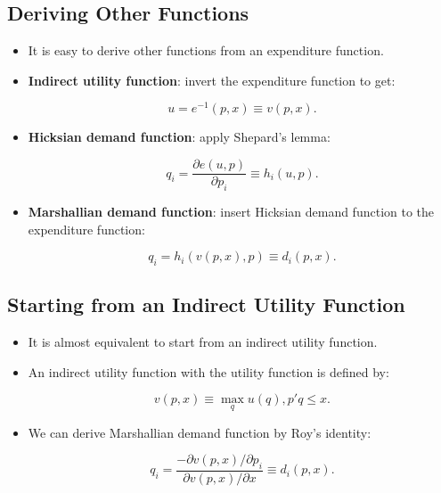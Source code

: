 \documentclass[]{book}
\providecommand{\tightlist}{%
  \setlength{\itemsep}{0pt}\setlength{\parskip}{0pt}}
\begin{document}
\subsection{Deriving Other Functions}\label{deriving-other-functions}

\begin{itemize}
\tightlist
\item
  It is easy to derive other functions from an expenditure function.
\item
  \textbf{Indirect utility function}: invert the expenditure function to
  get:

  \begin{equation}
  u = e^{-1}(p, x) \equiv v(p, x).
  \end{equation}
\item
  \textbf{Hicksian demand function}: apply Shepard's lemma:

  \begin{equation}
  q_i = \frac{\partial e(u, p)}{\partial p_i} \equiv h_i(u, p).
  \end{equation}
\item
  \textbf{Marshallian demand function}: insert Hicksian demand function
  to the expenditure function:

  \begin{equation}
  q_i = h_i(v(p, x), p) \equiv d_i(p, x).
  \end{equation}
\end{itemize}

\subsection{Starting from an Indirect Utility
Function}\label{starting-from-an-indirect-utility-function}

\begin{itemize}
\tightlist
\item
  It is almost equivalent to start from an indirect utility function.
\item
  An indirect utility function with the utility function is defined by:

  \begin{equation}
  v(p, x) \equiv \max_{q} u(q), p'q \le x.
  \end{equation}
\item
  We can derive Marshallian demand function by Roy's identity:

  \begin{equation}
  q_i = \frac{- \partial v(p, x)/\partial p_i}{\partial v(p, x)/\partial x} \equiv d_i(p, x).
  \end{equation}
\end{itemize}
\end{document}
